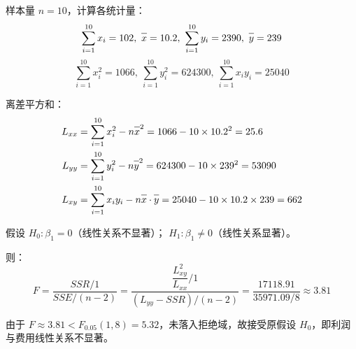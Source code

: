\documentclass{article}
\newcommand{\barline}[1]{\overline{#1\rule{0pt}{1.5ex}}}
\begin{document}
样本量 $n=10$，计算各统计量：
\[ \sum_{i=1}^{10}x_i=102,\ \barline{x}=10.2,\ \sum_{i=1}^{10}y_i=2390,\ \barline{y}=239 \]
\[ \sum_{i=1}^{10}x_i^2=1066,\ \sum_{i=1}^{10}y_i^2=624300,\ \sum_{i=1}^{10}x_iy_i=25040 \]

离差平方和：
\begin{align*}
    L_{xx} &= \sum_{i=1}^{10} x_i^2 - n\barline{x}^2 = 1066 - 10 \times 10.2^2 = 25.6 \\
    L_{yy} &= \sum_{i=1}^{10} y_i^2 - n\barline{y}^2 = 624300 - 10 \times 239^2 = 53090 \\
    L_{xy} &= \sum_{i=1}^{10} x_i y_i - n\barline{x}\cdot\barline{y} = 25040 - 10 \times 10.2 \times 239 = 662
\end{align*}

假设 $H_0: \beta_1 = 0$（线性关系不显著）； $H_1: \beta_1 \neq 0$（线性关系显著）。

则：
\[ F=\dfrac{SSR / 1}{SSE / (n-2)}=\dfrac{\dfrac{L_{xy}^2}{L_{xx}}/1}{(L_{yy}-SSR) / (n-2)}=\dfrac{17118.91}{35971.09/8}\approx3.81 \]

由于 $F\approx3.81<F_{0.05}(1,8)=5.32$，未落入拒绝域，故接受原假设 $H_0$，即利润与费用线性关系不显著。
\end{document}

